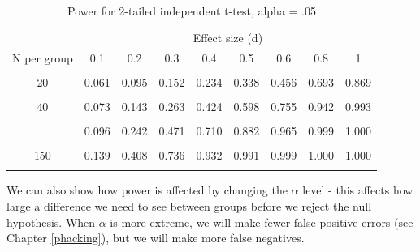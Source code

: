 \documentclass{krantz}
\begin{document}
\begin{table}

\caption{\label{tab:powertable}Power for 2-tailed independent t-test, alpha = .05}
\centering
\begin{tabular}[t]{ccccccccc}
\toprule
\multicolumn{1}{c}{ } & \multicolumn{8}{c}{Effect size (d)} \\
\cmidrule(l{3pt}r{3pt}){2-9}
N per group & 0.1 & 0.2 & 0.3 & 0.4 & 0.5 & 0.6 & 0.8 & 1\\
\midrule
\cellcolor{gray!6}{10} & \cellcolor{gray!6}{0.055} & \cellcolor{gray!6}{0.071} & \cellcolor{gray!6}{0.097} & \cellcolor{gray!6}{0.135} & \cellcolor{gray!6}{0.185} & \cellcolor{gray!6}{0.246} & \cellcolor{gray!6}{0.395} & \cellcolor{gray!6}{0.562}\\
20 & 0.061 & 0.095 & 0.152 & 0.234 & 0.338 & 0.456 & 0.693 & 0.869\\
\cellcolor{gray!6}{30} & \cellcolor{gray!6}{0.067} & \cellcolor{gray!6}{0.119} & \cellcolor{gray!6}{0.208} & \cellcolor{gray!6}{0.332} & \cellcolor{gray!6}{0.478} & \cellcolor{gray!6}{0.628} & \cellcolor{gray!6}{0.861} & \cellcolor{gray!6}{0.968}\\
40 & 0.073 & 0.143 & 0.263 & 0.424 & 0.598 & 0.755 & 0.942 & 0.993\\
\cellcolor{gray!6}{50} & \cellcolor{gray!6}{0.079} & \cellcolor{gray!6}{0.168} & \cellcolor{gray!6}{0.318} & \cellcolor{gray!6}{0.508} & \cellcolor{gray!6}{0.697} & \cellcolor{gray!6}{0.844} & \cellcolor{gray!6}{0.977} & \cellcolor{gray!6}{0.999}\\
\addlinespace
80 & 0.096 & 0.242 & 0.471 & 0.710 & 0.882 & 0.965 & 0.999 & 1.000\\
\cellcolor{gray!6}{100} & \cellcolor{gray!6}{0.108} & \cellcolor{gray!6}{0.291} & \cellcolor{gray!6}{0.560} & \cellcolor{gray!6}{0.804} & \cellcolor{gray!6}{0.940} & \cellcolor{gray!6}{0.988} & \cellcolor{gray!6}{1.000} & \cellcolor{gray!6}{1.000}\\
150 & 0.139 & 0.408 & 0.736 & 0.932 & 0.991 & 0.999 & 1.000 & 1.000\\
\cellcolor{gray!6}{200} & \cellcolor{gray!6}{0.169} & \cellcolor{gray!6}{0.514} & \cellcolor{gray!6}{0.849} & \cellcolor{gray!6}{0.979} & \cellcolor{gray!6}{0.999} & \cellcolor{gray!6}{1.000} & \cellcolor{gray!6}{1.000} & \cellcolor{gray!6}{1.000}\\
\bottomrule
\end{tabular}
\end{table}

We can also show how power is affected by changing the \(\alpha\) level - this affects how large a difference we need to see between groups before we reject the null hypothesis. When \(\alpha\) is more extreme, we will make fewer false positive errors (see Chapter \ref{phacking}), but we will make more false negatives.
\end{document}
